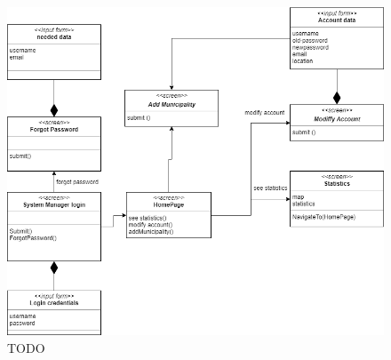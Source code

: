 \begin{figure}[h]
\centering
\includegraphics[width=\textwidth]{Images/ux4-correct.png}
\caption{\label{fig:ls}TODO }
\end{figure}
